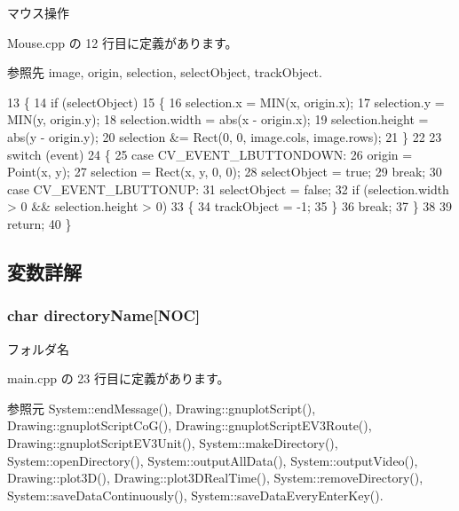 マウス操作 



 Mouse.\-cpp の 12 行目に定義があります。



参照先 image, origin, selection, select\-Object, track\-Object.


\begin{DoxyCode}
13 \{
14     \textcolor{keywordflow}{if} (selectObject)
15     \{
16         selection.x = MIN(x, origin.x);
17         selection.y = MIN(y, origin.y);
18         selection.width = abs(x - origin.x);
19         selection.height = abs(y - origin.y);
20         selection &= Rect(0, 0, image.cols, image.rows);
21     \}
22 
23     \textcolor{keywordflow}{switch} (event)
24     \{
25     \textcolor{keywordflow}{case} CV\_EVENT\_LBUTTONDOWN:
26         origin = Point(x, y);
27         selection = Rect(x, y, 0, 0);
28         selectObject = \textcolor{keyword}{true};
29         \textcolor{keywordflow}{break};
30     \textcolor{keywordflow}{case} CV\_EVENT\_LBUTTONUP:
31         selectObject = \textcolor{keyword}{false};
32         \textcolor{keywordflow}{if} (selection.width > 0 && selection.height > 0)
33         \{
34             trackObject = -1;
35         \}
36         \textcolor{keywordflow}{break};
37     \}
38 
39     \textcolor{keywordflow}{return};
40 \}\end{DoxyCode}


\subsection{変数詳解}
\subsubsection[{directory\-Name}]{\setlength{\rightskip}{0pt plus 5cm}char directory\-Name[{\bf N\-O\-C}]}\label{_path_tracking_and_induction_of_the_robot_8hpp_abefb498e9a643f68bb3d37c22953ddad}


フォルダ名 



 main.\-cpp の 23 行目に定義があります。



参照元 System\-::end\-Message(), Drawing\-::gnuplot\-Script(), Drawing\-::gnuplot\-Script\-Co\-G(), Drawing\-::gnuplot\-Script\-E\-V3\-Route(), Drawing\-::gnuplot\-Script\-E\-V3\-Unit(), System\-::make\-Directory(), System\-::open\-Directory(), System\-::output\-All\-Data(), System\-::output\-Video(), Drawing\-::plot3\-D(), Drawing\-::plot3\-D\-Real\-Time(), System\-::remove\-Directory(), System\-::save\-Data\-Continuously(), System\-::save\-Data\-Every\-Enter\-Key().

